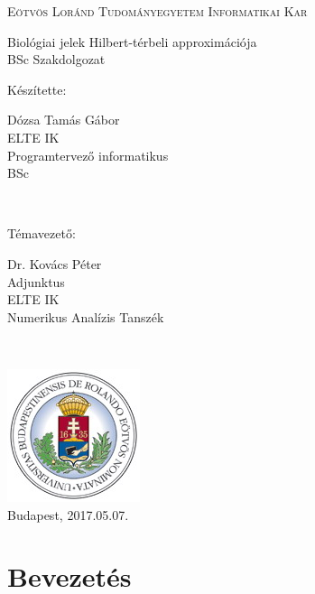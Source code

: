 \documentclass[oneside,titlepage,12pt,a4paper]{report}
\begin{document}
\begin{titlepage}
	\parbox[t]{5.5cm}{\vspace{1cm}}
\begin{center}
	\large
	\textsc{Eötvös Loránd Tudományegyetem \linebreak Informatikai Kar} \\[2cm]
\end{center}

\begin{center}
	\LARGE Biológiai jelek Hilbert-térbeli approximációja\\[0.55cm]
	\large BSc Szakdolgozat \\[1.9cm]
\end{center}

\begin{center}
	\parbox[t]{25mm}{Készítette:}
	\parbox[t]{5.5cm}
		{Dózsa Tamás Gábor\\
		ELTE IK\\
		Programtervező informatikus \\
		BSc
		}
	\\[0.9cm]
	
  \parbox[t]{25mm}{Témavezető:}
	\parbox[t]{5.5cm}{
		Dr. Kovács Péter\\
		Adjunktus\\
		ELTE IK\\
		Numerikus Analízis Tanszék
		}
	\\[3cm]
\end{center}

\begin{center}
	\includegraphics[scale=0.7]{./Abrak/Egyeb/elte_logo.jpg}\\[1cm]
	Budapest, 2017.05.07.
\end{center}
\end{titlepage}

\tableofcontents


\chapter{Bevezetés}
\label{intro}
\end{document}
